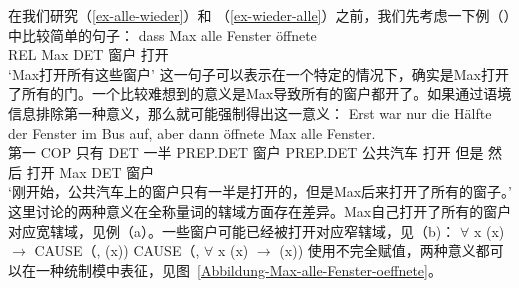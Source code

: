 \addlines
在我们研究（\ref{ex-alle-wieder}）和 （\ref{ex-wieder-alle}）之前，我们先考虑一下例（）中比较简单的句子：
\ea
\gll dass Max alle Fenster öffnete\\
	 REL Max DET 窗户 打开\\
\glt `Max打开所有这些窗户'
\z
这一句子可以表示在一个特定的情况下，确实是Max打开了所有的门。一个比较难想到的意义是Max导致所有的窗户都开了。如果通过语境信息排除第一种意义，那么就可能强制得出这一意义\citep{Egg99a}：
\ea
\gll Erst war nur die Hälfte der Fenster im Bus auf, aber dann öffnete Max alle Fenster.\\
     第一 COP 只有 DET 一半 PREP.DET 窗户 PREP.DET 公共汽车 打开 但是 然后 打开 Max DET 窗户\\
\glt `刚开始，公共汽车上的窗户只有一半是打开的，但是Max后来打开了所有的窗子。'
\z
这里讨论的两种意义在全称量词的辖域方面存在差异。Max自己打开了所有的窗户对应宽辖域，见例（a）。一些窗户可能已经被打开对应窄辖域，见（b)：
\eal
\ex $\forall$ x (x) $\to$ CAUSE（, (x))
\ex CAUSE（, $\forall$ x (x) $\to$ (x))
\zl
使用不完全赋值，两种意义都可以在一种统制模中表征，见图~\vref{Abbildung-Max-alle-Fenster-oeffnete}。
